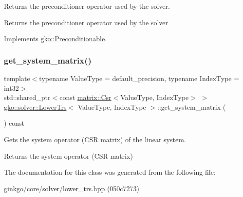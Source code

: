 Returns the preconditioner operator used by the solver. 

\begin{DoxyReturn}{Returns}
the preconditioner operator used by the solver 
\end{DoxyReturn}


Implements \hyperlink{classgko_1_1Preconditionable_ad9545089aef0dfc83bc7a74e5bf1d748}{gko\+::\+Preconditionable}.

\mbox{\label{classgko_1_1solver_1_1LowerTrs_a1f18336cc86c363eb41da44c2d282497}} 
\subsubsection{\texorpdfstring{get\+\_\+system\+\_\+matrix()}{get\_system\_matrix()}}
{\footnotesize\ttfamily template$<$typename Value\+Type  = default\+\_\+precision, typename Index\+Type  = int32$>$ \\
std\+::shared\+\_\+ptr$<$const \hyperlink{classgko_1_1matrix_1_1Csr}{matrix\+::\+Csr}$<$Value\+Type, Index\+Type$>$ $>$ \hyperlink{classgko_1_1solver_1_1LowerTrs}{gko\+::solver\+::\+Lower\+Trs}$<$ Value\+Type, Index\+Type $>$\+::get\+\_\+system\+\_\+matrix (\begin{DoxyParamCaption}{ }\end{DoxyParamCaption}) const\hspace{0.3cm}{\ttfamily [inline]}}



Gets the system operator (C\+SR matrix) of the linear system. 

\begin{DoxyReturn}{Returns}
the system operator (C\+SR matrix) 
\end{DoxyReturn}


The documentation for this class was generated from the following file\+:\begin{DoxyCompactItemize}
\item 
ginkgo/core/solver/lower\+\_\+trs.\+hpp (050c7273)\end{DoxyCompactItemize}

